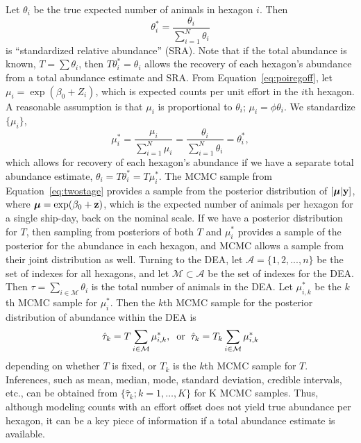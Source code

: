 \documentclass[11pt, titlepage]{article}
\begin{document}
\begin{spacing}{1.9}
\begin{flushleft}
Let $\theta_{i}$ be the true expected number of animals in hexagon $i$.  Then
\[
\theta^{*}_{i} = \frac{\theta_{i}}{\sum_{i=1}^{N}\theta_{i}}
\]
is ``standardized relative abundance'' (SRA). Note that if the total abundance is known, $T = \sum \theta_{i}$, then $T\theta^{*}_{i} = \theta_{i}$ allows the recovery of each hexagon's abundance from a total abundance estimate and SRA. From Equation~\eqref{eq:poiregoff}, let $\mu_{i} =\exp(\beta_{0} + Z_{i})$, which is expected counts per unit effort in the $i$th hexagon. A reasonable assumption is that $\mu_{i}$ is proportional to $\theta_{i}$; $\mu_{i} = \phi\theta_{i}$.  We standardize $\{\mu_i\}$,
\[
\mu^{*}_{i} = \frac{\mu_{i}}{\sum_{i=1}^{N}\mu_{i}}  = \frac{\theta_{i}}{\sum_{i=1}^{N}\theta_{i}} = \theta_{i}^{*},
\]
which allows for recovery of each hexagon's abundance if we have a separate total abundance estimate, $\theta_{i} = T\theta^{*}_{i} = T\mu^{*}_{i}$.  The MCMC sample from Equation~\eqref{eq:twostage} provides a sample from the posterior distribution of $[\mbox{\boldmath $\mu$}|\mathbf{y}]$, where $\mbox{\boldmath $\mu$} = \exp(\beta_{0} + \mathbf{z})$, which is the expected number of animals per hexagon for a single ship-day, back on the nominal scale. If we have a posterior distribution for $T$, then sampling from posteriors of both $T$ and $\mu^{*}_{i}$ provides a sample of the posterior for the abundance in each hexagon, and MCMC allows a sample from their joint distribution as well. Turning to the DEA, let $\mathcal{A} = \{1,2,...,n\}$ be the set of indexes for all hexagons, and let $\mathcal{M} \subset \mathcal{A}$ be the set of indexes for the DEA. Then $\tau = \sum_{i \in \mathcal{M}} \theta_{i}$ is the total number of animals in the DEA. Let $\mu^{*}_{i,k}$ be the $k$th MCMC sample for $\mu^{*}_{i}$.  Then the $k$th MCMC sample for the posterior distribution of abundance within the DEA is
\begin{equation} \label{eq:spexlicitabu}
\hat{\tau}_{k} = T\sum_{i \in \mathcal{M}}\mu^{*}_{i,k}, \hspace{.2cm} \textrm{or} \hspace{.2cm}\hat{\tau}_{k}= T_{k}\sum_{i \in \mathcal{M}}\mu^{*}_{i,k}
\end{equation}
depending on whether $T$ is fixed, or $T_{k}$ is the $k$th MCMC sample for $T$. Inferences, such as mean, median, mode, standard deviation, credible intervals, etc., can be obtained from $\{\hat{\tau}_{k}; k = 1,\ldots,K\}$ for K MCMC samples. Thus, although modeling counts with an effort offset does not yield true abundance per hexagon, it can be a key piece of information if a total abundance estimate is available. 


\end{flushleft}
\end{spacing}
\end{document}
